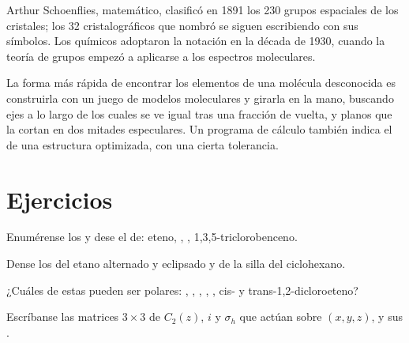 \begin{history}
Arthur Schoenflies, matemático, clasificó en 1891 los 230 grupos
espaciales de los cristales; los 32  cristalográficos que nombró se siguen
escribiendo con sus símbolos. Los químicos adoptaron la notación en la década de 1930,
cuando la teoría de grupos empezó a aplicarse a los espectros moleculares.
\end{history}

\begin{inthelab}
La forma más rápida de encontrar los elementos de una molécula desconocida es construirla
con un juego de modelos moleculares y girarla en la mano, buscando ejes
a lo largo de los cuales se ve igual tras una fracción de vuelta, y planos
que la cortan en dos mitades especulares. Un programa de cálculo también indica
el  de una estructura optimizada, con una cierta tolerancia.
\end{inthelab}

\section{Ejercicios}

\begin{exercise}[$\star$]\label{exo:b3:point-groups:1}
Enumérense los  y dese el  de: eteno, ,
, 1,3,5-triclorobenceno.
\end{exercise}

\begin{exercise}[$\star$]\label{exo:b3:point-groups:2}
Dense los  del etano alternado y eclipsado y de la silla del
ciclohexano.
\end{exercise}

\begin{exercise}[$\star$]\label{exo:b3:point-groups:3}
¿Cuáles de estas pueden ser polares: , , , , ,
cis- y trans-1,2-dicloroeteno?
\end{exercise}

\begin{exercise}[$\star$]\label{exo:b3:point-groups:4}
Escríbanse las matrices $3\times3$ de $C_2(z)$, $i$ y $\sigma_h$ que actúan sobre $(x, y, z)$,
y sus .
\end{exercise}


